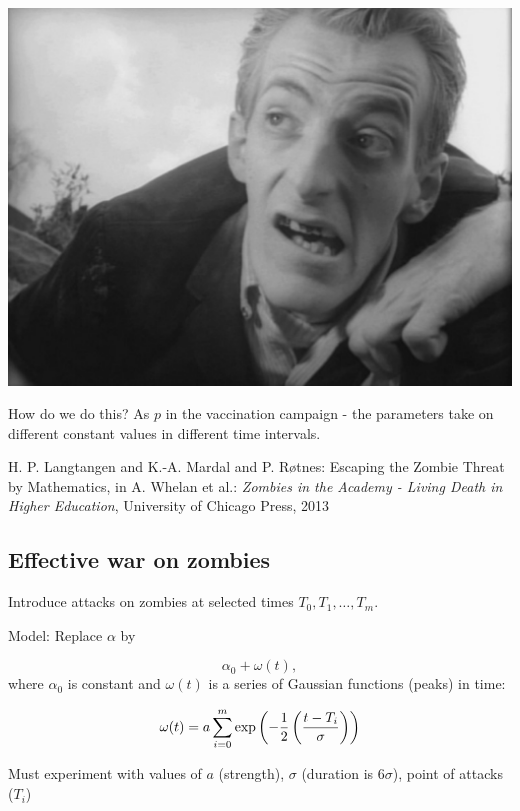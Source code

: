 \documentclass[%
twoside,                 %
final,                   %
10pt]{article}
\begin{document}


\begin{center}  %
  \centerline{\includegraphics[width=0.9\linewidth]{fig/TNotLD.pdf}}
\end{center}


How do we do this? As $p$ in the vaccination campaign - the parameters
take on different constant values in different time intervals.

H. P. Langtangen and K.-A. Mardal and P. Røtnes:
Escaping the Zombie Threat by Mathematics, in
A. Whelan et al.: \emph{Zombies in the Academy - Living Death in Higher Education},
University of Chicago Press, 2013

\subsection{Effective war on zombies}

Introduce attacks on zombies at selected times $T_0, T_1, \ldots, T_m$.

Model: Replace $\alpha$ by

\[ \alpha_0 + \omega (t),\]
where $\alpha_0$ is constant and $\omega(t)$ is a series of
Gaussian functions (peaks) in time:

\[ \omega(t) = a\sum_{i=0}^m \exp{\left(-\frac{1}{2}\left({t - T_i\over\sigma}\right)\right)}
\]

Must experiment with values of $a$ (strength), $\sigma$ (duration is $6\sigma$),
point of attacks ($T_i$)

\end{document}

